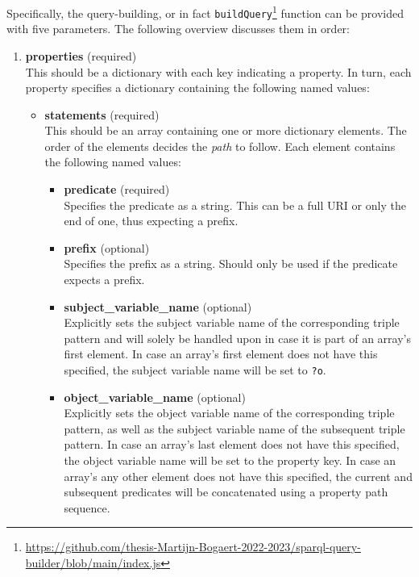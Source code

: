 Specifically, the query-building, or in fact \texttt{buildQuery}\footnote{\url{https://github.com/thesis-Martijn-Bogaert-2022-2023/sparql-query-builder/blob/main/index.js}} function can be provided with five parameters. The following overview discusses them in order:

\begin{enumerate}
    \item \textbf{properties} (required)\\
    This should be a dictionary with each key indicating a property. In turn, each property specifies a dictionary containing the following named values:
    \begin{itemize}
        \item \textbf{statements} (required)\\
        This should be an array containing one or more dictionary elements. The order of the elements decides the \textit{path} to follow. Each element contains the following named values:
        \begin{itemize}
            \item \textbf{predicate} (required)\\
            Specifies the predicate as a string. This can be a full URI or only the end of one, thus expecting a prefix.
                
            \item \textbf{prefix} (optional)\\
            Specifies the prefix as a string. Should only be used if the predicate expects a prefix.
                
            \item \textbf{subject\_variable\_name} (optional)\\
            Explicitly sets the subject variable name of the corresponding triple pattern and will solely be handled upon in case it is part of an array's first element. In case an array's first element does not have this specified, the subject variable name will be set to \texttt{?o}.
                
            \item \textbf{object\_variable\_name} (optional)\\
            Explicitly sets the object variable name of the corresponding triple pattern, as well as the subject variable name of the subsequent triple pattern. In case an array's last element does not have this specified, the object variable name will be set to the property key. In case an array's any other element does not have this specified, the current and subsequent predicates will be concatenated using a property path sequence.


\end{itemize}
\end{itemize}
\end{enumerate}

